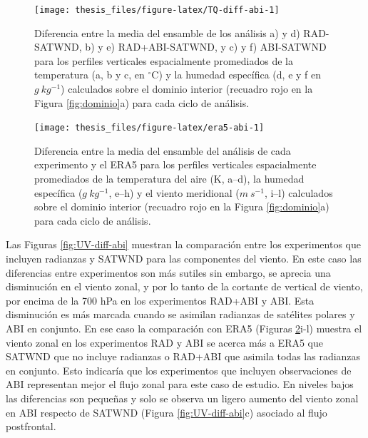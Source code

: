 \documentclass[12pt,oneside,a4paper]{reedthesis}
\begin{document}
\begin{figure}

{\centering \texttt{[image: thesis\_files/figure-latex/TQ-diff-abi-1]} 

}

\caption{Diferencia entre la media del ensamble de los análisis a) y d) RAD-SATWND, b) y e) RAD+ABI-SATWND, y c) y f) ABI-SATWND para los perfiles verticales espacialmente promediados de la temperatura (a, b y c, en \(^\circ\)C) y la humedad específica (d, e y f en \(g\ kg^{-1}\)) calculados sobre el dominio interior (recuadro rojo en la Figura \ref{fig:dominio}a) para cada ciclo de análisis.}\label{fig:TQ-diff-abi}
\end{figure}

\begin{figure}

{\centering \texttt{[image: thesis\_files/figure-latex/era5-abi-1]} 

}

\caption{Diferencia entre la media del ensamble del análisis de cada experimento y el ERA5 para los perfiles verticales espacialmente promediados de la temperatura del aire (K, a--d), la humedad específica (\(g\ kg^{-1}\), e--h) y el viento meridional (\(m\ s^{-1}\), i--l) calculados sobre el dominio interior (recuadro rojo en la Figura \ref{fig:dominio}a) para cada ciclo de análisis.}\label{fig:era5-abi}
\end{figure}
Las Figuras \ref{fig:UV-diff-abi} muestran la comparación entre los experimentos que incluyen radianzas y SATWND para las componentes del viento. En este caso las diferencias entre experimentos son más sutiles sin embargo, se aprecia una disminución en el viento zonal, y por lo tanto de la cortante de vertical de viento, por encima de la 700 hPa en los experimentos RAD+ABI y ABI. Esta disminución es más marcada cuando se asimilan radianzas de satélites polares y ABI en conjunto. En ese caso la comparación con ERA5 (Figuras \ref{fig:era5-abi}i-l) muestra el viento zonal en los experimentos RAD y ABI se acerca más a ERA5 que SATWND que no incluye radianzas o RAD+ABI que asimila todas las radianzas en conjunto. Esto indicaría que los experimentos que incluyen observaciones de ABI representan mejor el flujo zonal para este caso de estudio. En niveles bajos las diferencias son pequeñas y solo se observa un ligero aumento del viento zonal en ABI respecto de SATWND (Figura \ref{fig:UV-diff-abi}c) asociado al flujo postfrontal.
\end{document}
